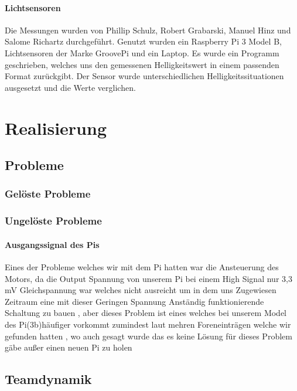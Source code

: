 \documentclass[notitlepage]{report}
\begin{document}
\subsubsection{Lichtsensoren}

Die Messungen wurden von Phillip Schulz, Robert Grabarski, Manuel Hinz und Salome Richartz durchgef\"{u}hrt. Genutzt wurden ein Raspberry Pi 3 Model B, Lichtsensoren der Marke GroovePi und ein Laptop. Es wurde ein Programm geschrieben, welches uns den gemessenen Helligkeitswert in einem passenden Format zur\"{u}ckgibt. Der Sensor wurde unterschiedlichen Helligkeitssituationen ausgesetzt und die Werte verglichen.


\chapter{Realisierung}

\section{Probleme}

\subsection{Gel\"{o}ste Probleme}

\subsection{Ungel\"{o}ste Probleme}

\subsubsection{Ausgangssignal des Pis}

Eines der Probleme welches wir mit dem Pi hatten war die Ansteuerung des Motors, da die Output Spannung von unserem Pi bei einem High Signal nur 3,3 mV Gleichspannung war welches nicht ausreicht um in dem uns Zugewiesen Zeitraum eine mit dieser Geringen Spannung Anständig funktionierende Schaltung zu bauen , aber dieses Problem ist eines welches bei unserem Model des Pi(3b)häufiger vorkommt zumindest laut mehren Foreneinträgen welche wir gefunden hatten , wo auch gesagt wurde das es keine Lösung für dieses Problem gäbe außer einen neuen Pi zu holen 


\section{Teamdynamik}
\end{document}

